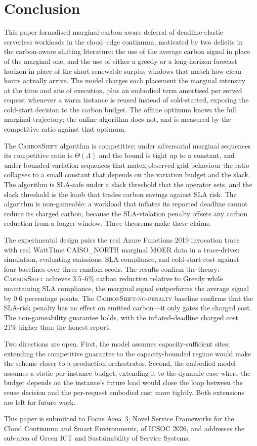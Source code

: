 \section{Conclusion}
\label{sec:conclusion}

This paper formalised marginal-carbon-aware deferral of deadline-elastic serverless workloads in the cloud--edge continuum, motivated by two deficits in the carbon-aware shifting literature: the use of the average carbon signal in place of the marginal one, and the use of either a greedy or a long-horizon forecast horizon in place of the short renewable-surplus windows that match how clean hours actually arrive. The model charges each placement the marginal intensity at the time and site of execution, plus an embodied term amortised per served request whenever a warm instance is reused instead of cold-started, exposing the cold-start decision to the carbon budget. The offline optimum knows the full marginal trajectory; the online algorithm does not, and is measured by the competitive ratio against that optimum.

The \textsc{CarbonShift} algorithm is competitive: under adversarial marginal sequences its competitive ratio is $\Theta(\Lambda)$ and the bound is tight up to a constant, and under bounded-variation sequences that match observed grid behaviour the ratio collapses to a small constant that depends on the variation budget and the slack. The algorithm is SLA-safe under a slack threshold that the operator sets, and the slack threshold is the knob that trades carbon savings against SLA risk. The algorithm is non-gameable: a workload that inflates its reported deadline cannot reduce its charged carbon, because the SLA-violation penalty offsets any carbon reduction from a longer window. Three theorems make these claims.

The experimental design pairs the real Azure Functions 2019 invocation trace with real WattTime CAISO\_NORTH marginal MOER data in a trace-driven simulation, evaluating emissions, SLA compliance, and cold-start cost against four baselines over three random seeds. The results confirm the theory: \textsc{CarbonShift} achieves 3.5--6\% carbon reduction relative to Greedy while maintaining SLA compliance, the marginal signal outperforms the average signal by 0.6 percentage points. The \textsc{CarbonShift-no-penalty} baseline confirms that the SLA-risk penalty has no effect on emitted carbon---it only gates the charged cost. The non-gameability guarantee holds, with the inflated-deadline charged cost 21\% higher than the honest report.

Two directions are open. First, the model assumes capacity-sufficient sites; extending the competitive guarantee to the capacity-bounded regime would make the scheme closer to a production orchestrator. Second, the embodied model assumes a static per-instance budget; extending it to the dynamic case where the budget depends on the instance's future load would close the loop between the reuse decision and the per-request embodied cost more tightly. Both extensions are left for future work.

This paper is submitted to Focus Area~3, Novel Service Frameworks for the Cloud Continuum and Smart Environments, of ICSOC 2026, and addresses the sub-area of Green ICT and Sustainability of Service Systems.
